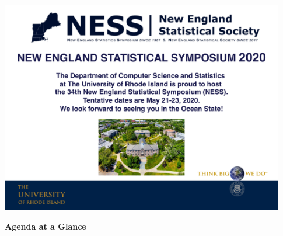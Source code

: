 \documentclass[10pt]{article}
\begin{document}
\begin{center}
\includegraphics[width=0.93\textwidth]{ness2020flyer.pdf}
\end{center} 
\clearpage

\begin{center}
  {\bf\Huge Agenda at a Glance}
\end{center}
\end{document}
